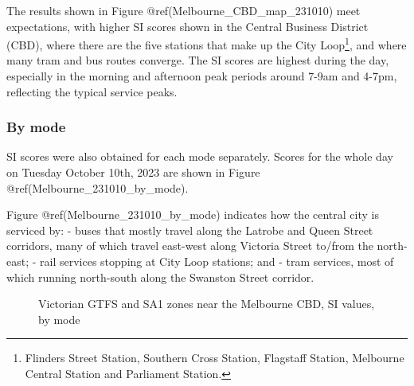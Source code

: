 \documentclass[preprint, 3p,
authoryear]{elsarticle} %
\begin{document}
The results shown in Figure @ref(Melbourne\_CBD\_map\_231010) meet
expectations, with higher SI scores shown in the Central Business
District (CBD), where there are the five stations that make up the City
Loop\footnote{Flinders Street Station, Southern Cross Station, Flagstaff
  Station, Melbourne Central Station and Parliament Station.}, and where
many tram and bus routes converge. The SI scores are highest during the
day, especially in the morning and afternoon peak periods around 7-9am
and 4-7pm, reflecting the typical service peaks.

\hypertarget{by-mode}{%
\subsubsection{By mode}\label{by-mode}}

SI scores were also obtained for each mode separately. Scores for the
whole day on Tuesday October 10th, 2023 are shown in Figure
@ref(Melbourne\_231010\_by\_mode).

Figure @ref(Melbourne\_231010\_by\_mode) indicates how the central city
is serviced by: - buses that mostly travel along the Latrobe and Queen
Street corridors, many of which travel east-west along Victoria Street
to/from the north-east; - rail services stopping at City Loop stations;
and - tram services, most of which running north-south along the
Swanston Street corridor.

\begin{figure}
\caption{Victorian GTFS and SA1 zones near the Melbourne CBD, SI values, by mode}\label{fig:Melbourne_231015_by_mode}
\end{figure}
\end{document}
